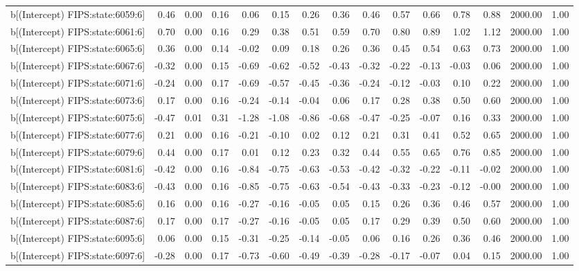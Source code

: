 \begin{table}[ht]
\begin{tabular}{rrrrrrrrrrrrrrr}
  b[(Intercept) FIPS:state:6059:6] & 0.46 & 0.00 & 0.16 & 0.06 & 0.15 & 0.26 & 0.36 & 0.46 & 0.57 & 0.66 & 0.78 & 0.88 & 2000.00 & 1.00 \\ 
  b[(Intercept) FIPS:state:6061:6] & 0.70 & 0.00 & 0.16 & 0.29 & 0.38 & 0.51 & 0.59 & 0.70 & 0.80 & 0.89 & 1.02 & 1.12 & 2000.00 & 1.00 \\ 
  b[(Intercept) FIPS:state:6065:6] & 0.36 & 0.00 & 0.14 & -0.02 & 0.09 & 0.18 & 0.26 & 0.36 & 0.45 & 0.54 & 0.63 & 0.73 & 2000.00 & 1.00 \\ 
  b[(Intercept) FIPS:state:6067:6] & -0.32 & 0.00 & 0.15 & -0.69 & -0.62 & -0.52 & -0.43 & -0.32 & -0.22 & -0.13 & -0.03 & 0.06 & 2000.00 & 1.00 \\ 
  b[(Intercept) FIPS:state:6071:6] & -0.24 & 0.00 & 0.17 & -0.69 & -0.57 & -0.45 & -0.36 & -0.24 & -0.12 & -0.03 & 0.10 & 0.22 & 2000.00 & 1.00 \\ 
  b[(Intercept) FIPS:state:6073:6] & 0.17 & 0.00 & 0.16 & -0.24 & -0.14 & -0.04 & 0.06 & 0.17 & 0.28 & 0.38 & 0.50 & 0.60 & 2000.00 & 1.00 \\ 
  b[(Intercept) FIPS:state:6075:6] & -0.47 & 0.01 & 0.31 & -1.28 & -1.08 & -0.86 & -0.68 & -0.47 & -0.25 & -0.07 & 0.16 & 0.33 & 2000.00 & 1.00 \\ 
  b[(Intercept) FIPS:state:6077:6] & 0.21 & 0.00 & 0.16 & -0.21 & -0.10 & 0.02 & 0.12 & 0.21 & 0.31 & 0.41 & 0.52 & 0.65 & 2000.00 & 1.00 \\ 
  b[(Intercept) FIPS:state:6079:6] & 0.44 & 0.00 & 0.17 & 0.01 & 0.12 & 0.23 & 0.32 & 0.44 & 0.55 & 0.65 & 0.76 & 0.85 & 2000.00 & 1.00 \\ 
  b[(Intercept) FIPS:state:6081:6] & -0.42 & 0.00 & 0.16 & -0.84 & -0.75 & -0.63 & -0.53 & -0.42 & -0.32 & -0.22 & -0.11 & -0.02 & 2000.00 & 1.00 \\ 
  b[(Intercept) FIPS:state:6083:6] & -0.43 & 0.00 & 0.16 & -0.85 & -0.75 & -0.63 & -0.54 & -0.43 & -0.33 & -0.23 & -0.12 & -0.00 & 2000.00 & 1.00 \\ 
  b[(Intercept) FIPS:state:6085:6] & 0.16 & 0.00 & 0.16 & -0.27 & -0.16 & -0.05 & 0.05 & 0.15 & 0.26 & 0.36 & 0.46 & 0.57 & 2000.00 & 1.00 \\ 
  b[(Intercept) FIPS:state:6087:6] & 0.17 & 0.00 & 0.17 & -0.27 & -0.16 & -0.05 & 0.05 & 0.17 & 0.29 & 0.39 & 0.50 & 0.60 & 2000.00 & 1.00 \\ 
  b[(Intercept) FIPS:state:6095:6] & 0.06 & 0.00 & 0.15 & -0.31 & -0.25 & -0.14 & -0.05 & 0.06 & 0.16 & 0.26 & 0.36 & 0.46 & 2000.00 & 1.00 \\ 
  b[(Intercept) FIPS:state:6097:6] & -0.28 & 0.00 & 0.17 & -0.73 & -0.60 & -0.49 & -0.39 & -0.28 & -0.17 & -0.07 & 0.04 & 0.15 & 2000.00 & 1.00 \\ 

\end{tabular}
\end{table}
